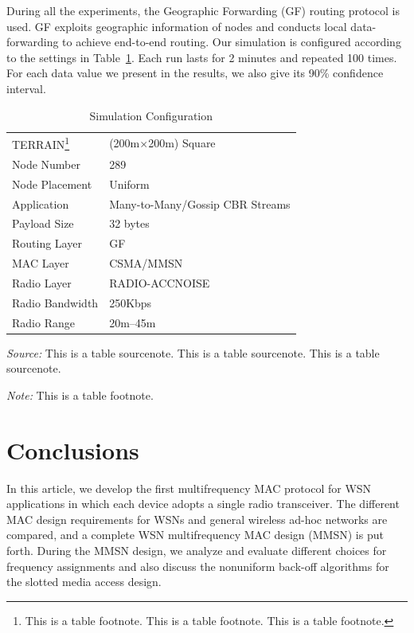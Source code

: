 \documentclass[format=acmsmall, review=false]{acmart}
\begin{document}
During all the experiments, the Geographic Forwarding (GF)
\cite{Akyildiz-01} routing protocol is used. GF exploits geographic
information of nodes and conducts local data-forwarding to achieve
end-to-end routing. Our simulation is configured according to the
settings in Table~\ref{tab:one}. Each run lasts for 2 minutes and
repeated 100 times. For each data value we present in the results, we
also give its 90\% confidence interval.

\begin{table}%
	\caption{Simulation Configuration}
	\label{tab:one}
	\begin{minipage}{\columnwidth}
		\begin{center}
			\begin{tabular}{ll}
				\toprule
				TERRAIN\footnote{This is a table footnote. This is a
					table footnote. This is a table footnote.}   & (200m$\times$200m) Square\\
				Node Number     & 289\\
				Node Placement  & Uniform\\
				Application     & Many-to-Many/Gossip CBR Streams\\
				Payload Size    & 32 bytes\\
				Routing Layer   & GF\\
				MAC Layer       & CSMA/MMSN\\
				Radio Layer     & RADIO-ACCNOISE\\
				Radio Bandwidth & 250Kbps\\
				Radio Range     & 20m--45m\\
				\bottomrule
			\end{tabular}
		\end{center}
		\bigskip\centering
		\footnotesize\emph{Source:} This is a table
		sourcenote. This is a table sourcenote. This is a table
		sourcenote.

		\emph{Note:} This is a table footnote.
	\end{minipage}
\end{table}%


\section{Conclusions}

In this article, we develop the first multifrequency MAC protocol for
WSN applications in which each device adopts a
single radio transceiver. The different MAC design requirements for
WSNs and general wireless ad-hoc networks are
compared, and a complete WSN multifrequency MAC design (MMSN) is
put forth. During the MMSN design, we analyze and evaluate different
choices for frequency assignments and also discuss the nonuniform
back-off algorithms for the slotted media access design.
\end{document}

